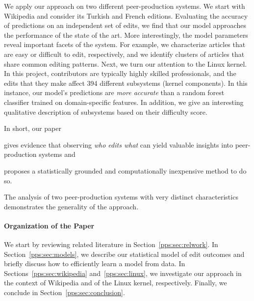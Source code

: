 We apply our approach on two different peer-production systems.
We start with Wikipedia and consider its Turkish and French editions.
Evaluating the accuracy of predictions on an independent set of edits, we find that our model approaches the performance of the state of the art.
More interestingly, the model parameters reveal important facets of the system.
For example, we characterize articles that are easy or difficult to edit, respectively, and we identify clusters of articles that share common editing patterns.
Next, we turn our attention to the Linux kernel.
In this project, contributors are typically highly skilled professionals, and the edits that they make affect \num{394} different subsystems (kernel components).
In this instance, our model's predictions are \emph{more accurate} than a random forest classifier trained on domain-specific features.
In addition, we give an interesting qualitative description of subsystems based on their difficulty score.

In short, our paper
\begin{enuminline}
	\item gives evidence that observing \emph{who edits what} can yield valuable insights into peer-production systems and
	\item proposes a statistically grounded and computationally inexpensive method to do so.
\end{enuminline}
The analysis of two peer-production systems with very distinct characteristics demonstrates the generality of the approach.

\paragraph{Organization of the Paper}
We start by reviewing related literature in Section~\ref{pps:sec:relwork}.
In Section~\ref{pps:sec:models}, we describe our statistical model of edit outcomes and briefly discuss how to efficiently learn a model from data.
In Sections~\ref{pps:sec:wikipedia} and~\ref{pps:sec:linux}, we investigate our approach in the context of Wikipedia and of the Linux kernel, respectively.
Finally, we conclude in Section~\ref{pps:sec:conclusion}.
